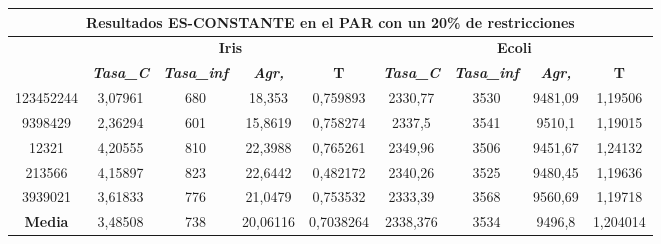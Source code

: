 \documentclass[12pt, spanish]{article}
\begin{document}
\begin{table}[H]
\begin{tabular}{|c|c|c|c|c|c|c|c|c|}
\hline
\multicolumn{9}{|c|}{\textbf{Resultados ES-CONSTANTE en el PAR con un 20\% de restricciones}}                                                                                                                     \\ \hline
\multirow{2}{*}{} & \multicolumn{4}{c|}{\textbf{Iris}}                                                            & \multicolumn{4}{c|}{\textbf{Ecoli}}                                                           \\ \cline{2-9} 
                  & \textit{\textbf{Tasa\_C}} & \textit{\textbf{Tasa\_inf}} & \textit{\textbf{Agr,}} & \textbf{T} & \textit{\textbf{Tasa\_C}} & \textit{\textbf{Tasa\_inf}} & \textit{\textbf{Agr,}} & \textbf{T} \\ \hline
123452244         & 3,07961                   & 680                         & 18,353                 & 0,759893   & 2330,77                   & 3530                        & 9481,09                & 1,19506    \\ \hline
9398429           & 2,36294                   & 601                         & 15,8619                & 0,758274   & 2337,5                    & 3541                        & 9510,1                 & 1,19015    \\ \hline
12321             & 4,20555                   & 810                         & 22,3988                & 0,765261   & 2349,96                   & 3506                        & 9451,67                & 1,24132    \\ \hline
213566            & 4,15897                   & 823                         & 22,6442                & 0,482172   & 2340,26                   & 3525                        & 9480,45                & 1,19636    \\ \hline
3939021           & 3,61833                   & 776                         & 21,0479                & 0,753532   & 2333,39                   & 3568                        & 9560,69                & 1,19718    \\ \hline
\textbf{Media}    & 3,48508                   & 738                         & 20,06116               & 0,7038264  & 2338,376                  & 3534                        & 9496,8                 & 1,204014   \\ \hline
\end{tabular}
\end{table}
\end{document}
